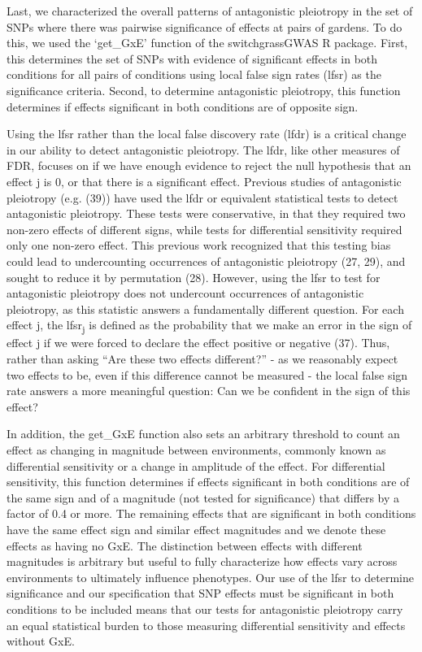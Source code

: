 \documentclass[
  9pt,
  twocolumn,
  twoside]{pnas-new}
\begin{document}
Last, we characterized the overall patterns of antagonistic pleiotropy
in the set of SNPs where there was pairwise significance of effects at
pairs of gardens. To do this, we used the `get\_GxE' function of the
switchgrassGWAS R package. First, this determines the set of SNPs with
evidence of significant effects in both conditions for all pairs of
conditions using local false sign rates (lfsr) as the significance
criteria. Second, to determine antagonistic pleiotropy, this function
determines if effects significant in both conditions are of opposite
sign.

Using the lfsr rather than the local false discovery rate (lfdr) is a
critical change in our ability to detect antagonistic pleiotropy. The
lfdr, like other measures of FDR, focuses on if we have enough evidence
to reject the null hypothesis that an effect j is 0, or that there is a
significant effect. Previous studies of antagonistic pleiotropy (e.g.
(39)) have used the lfdr or equivalent statistical tests to detect
antagonistic pleiotropy. These tests were conservative, in that they
required two non-zero effects of different signs, while tests for
differential sensitivity required only one non-zero effect. This
previous work recognized that this testing bias could lead to
undercounting occurrences of antagonistic pleiotropy (27, 29), and
sought to reduce it by permutation (28). However, using the lfsr to test
for antagonistic pleiotropy does not undercount occurrences of
antagonistic pleiotropy, as this statistic answers a fundamentally
different question. For each effect j, the lfsr\textsubscript{j} is
defined as the probability that we make an error in the sign of effect j
if we were forced to declare the effect positive or negative (37). Thus,
rather than asking ``Are these two effects different?'' - as we
reasonably expect two effects to be, even if this difference cannot be
measured - the local false sign rate answers a more meaningful question:
Can we be confident in the sign of this effect?

In addition, the get\_GxE function also sets an arbitrary threshold to
count an effect as changing in magnitude between environments, commonly
known as differential sensitivity or a change in amplitude of the
effect. For differential sensitivity, this function determines if
effects significant in both conditions are of the same sign and of a
magnitude (not tested for significance) that differs by a factor of 0.4
or more. The remaining effects that are significant in both conditions
have the same effect sign and similar effect magnitudes and we denote
these effects as having no GxE. The distinction between effects with
different magnitudes is arbitrary but useful to fully characterize how
effects vary across environments to ultimately influence phenotypes. Our
use of the lfsr to determine significance and our specification that SNP
effects must be significant in both conditions to be included means that
our tests for antagonistic pleiotropy carry an equal statistical burden
to those measuring differential sensitivity and effects without GxE.
\end{document}
